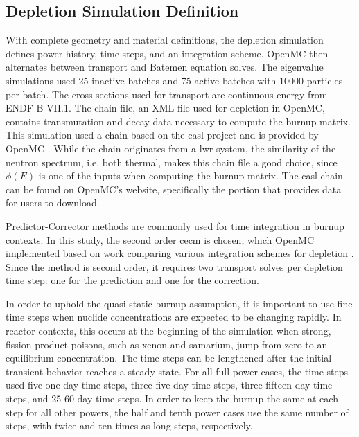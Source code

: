 \documentclass[letterpaper]{physor2024}
\begin{document}
\subsection{Depletion Simulation Definition}\label{sec:depl_sim}
With complete geometry and material definitions, the depletion simulation defines power history, time steps, and an integration scheme. OpenMC then alternates between transport and Batemen equation solves. The eigenvalue simulations used 25 inactive batches and 75 active batches with 10000 particles per batch. The cross sections used for transport are continuous energy from ENDF-B-VII.1. The chain file, an XML file used for depletion in OpenMC, contains transmutation and decay data necessary to compute the burnup matrix. This simulation used a chain based on the \gls{casl} project \cite{CASL-report} and is provided by OpenMC \cite{openmc-chains}. While the chain originates from a \gls{lwr} system, the similarity of the neutron spectrum, i.e. both thermal, makes this chain file a good choice, since $\phi(E)$ is one of the inputs when computing the burnup matrix. The \gls{casl} chain can be found on OpenMC's website, specifically the portion that provides data for users to download.

Predictor-Corrector methods are commonly used for time integration in burnup contexts. In this study, the second order \gls{cecm} is chosen, which OpenMC implemented based on work comparing various integration schemes for depletion \cite{isotalo_comparison_2015}. Since the method is second order, it requires two transport solves per depletion time step: one for the prediction and one for the correction.

In order to uphold the quasi-static burnup assumption, it is important to use fine time steps when nuclide concentrations are expected to be changing rapidly. In reactor contexts, this occurs at the beginning of the simulation when strong, fission-product poisons, such as xenon and samarium, jump from zero to an equilibrium concentration. The time steps can be lengthened after the initial transient behavior reaches a steady-state. For all full power cases, the time steps used five one-day time steps, three five-day time steps, three fifteen-day time steps, and 25 60-day time steps. In order to keep the burnup the same at each step for all other powers, the half and tenth power cases use the same number of steps, with twice and ten times as long steps, respectively.
\end{document}
